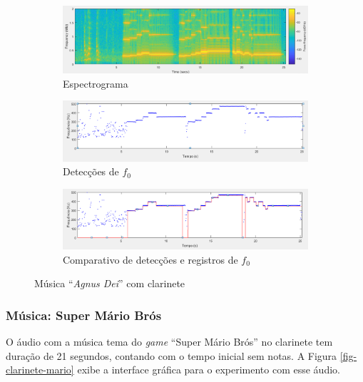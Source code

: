 \begin{figure}
	\begin{subfigure}{1\textwidth}
		\includegraphics[width=\linewidth]{pasta1_figuras/clarinete-agnusdei-2.png}
		\caption{Espectrograma}
		\label{fig-clarinete-agnusdei-2}
	\end{subfigure}
	\hspace*{\fill} %
	\begin{subfigure}{1\textwidth}
		\includegraphics[width=\linewidth]{pasta1_figuras/clarinete-agnusdei-3.png}
		\caption{Detecções de $f_0$}
		\label{fig-clarinete-agnusdei-3}
	\end{subfigure}
	\hspace*{\fill} %
	\begin{subfigure}{1\textwidth}
		\includegraphics[width=\linewidth]{pasta1_figuras/clarinete-agnusdei-4.png}
		\caption{Comparativo de detecções e registros de $f_0$}
		\label{fig-clarinete-agnusdei-4}
	\end{subfigure}
	\caption{Música ``\textit{Agnus Dei}'' com clarinete}
\end{figure}

\subsubsection{Música: Super Mário Brós}

O áudio com a música tema do \textit{game} ``Super Mário Brós'' no clarinete tem duração de 21 segundos, contando com o tempo inicial sem notas. A Figura \ref{fig-clarinete-mario} exibe a interface gráfica para o experimento com esse áudio.

